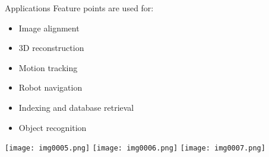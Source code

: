 \begin{frame}{Applications }
    Feature points are used for:
    \begin{itemize}
        \item Image alignment
        \item 3D reconstruction
        \item Motion tracking
        \item Robot navigation
        \item Indexing and database retrieval
        \item Object recognition
    \end{itemize}
    {
        \centering
        \texttt{[image: img0005.png]}
        \texttt{[image: img0006.png]}
        \texttt{[image: img0007.png]}
    }
\end{frame}
%
%
%
%
%
%
%
%
